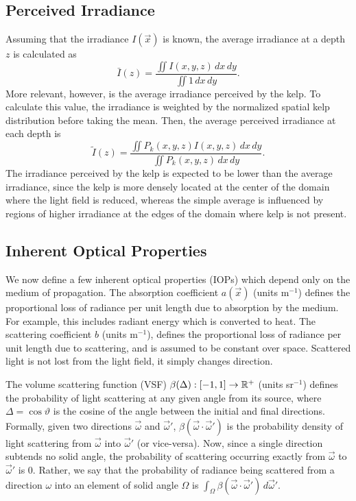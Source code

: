 \subsection{Perceived Irradiance}
\label{sec:perceived_irrad}
Assuming that the irradiance $I(\vec{x})$ is known,
the average irradiance at a depth $z$ is calculated as
\begin{equation*}
  \bar{I}(z) = \frac{\iint I(x,y,z)\, dx\, dy}{\iint 1\, dx\, dy}.
\end{equation*}
More relevant, however, is the average irradiance perceived by the kelp.
To calculate this value, the irradiance is weighted by the
normalized spatial kelp distribution before taking the mean.
Then, the average perceived irradiance at each depth is
\newcommand{\Iperk}{\tilde{I}}
\begin{equation*}
   \Iperk(z) = \frac{\iint P_k(x,y,z)I(x,y,z)\, dx\, dy}{\iint P_k(x,y,z)\, dx\, dy}.
\end{equation*}
The irradiance perceived by the kelp is expected to be lower than the average irradiance,
since the kelp is more densely located at the center of the domain where the light field is reduced,
whereas the simple average is influenced by regions of higher irradiance at the edges of the domain where kelp is not present.

\subsection{Inherent Optical Properties}
\label{sec:iops}
We now define a few inherent optical properties (IOPs) which depend only on the medium of propagation.
The absorption coefficient $a(\vec{x})$ (units m$^{-1}$) defines the
proportional loss of radiance per unit length due to absorption by the medium.
For example, this includes radiant energy which is converted to heat.
The scattering coefficient $b$ (units m$^{-1}$), defines the proportional loss
of radiance per unit length due to scattering, and is assumed to be constant over space.
Scattered light is not lost from the light field, it simply changes direction.

The volume scattering function (VSF) $\beta(\Delta): [-1, 1] \to \mathbb{R}^+$ (units sr$^{-1}$) defines the probability of light scattering at any given angle from its source, where $\Delta=\cos\vartheta$ is the cosine of the angle between the initial and final directions.
Formally, given two directions $\vec{\omega}$ and $\vec{\omega}'$, $\beta(\vec{\omega} \cdot \vec{\omega}')$ is the probability density of light scattering from $\vec{\omega}$ into $\vec{\omega}'$ (or vice-versa).
Now, since a single direction subtends no solid angle, the probability of scattering occurring exactly from $\vec{\omega}$ to $\vec{\omega}'$ is 0.
Rather, we say that the probability of radiance being scattered from a direction $\omega$ into an element of solid angle $\Omega$ is $\int_\Omega \beta(\vec{\omega} \cdot \vec{\omega}')\, d\vec{\omega}'$.

